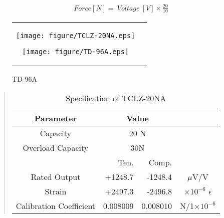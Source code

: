 \documentclass[a4paper,12pt]{article_vdlab_sotsuron}
\begin{document}
\vspace{-10mm}
\begin{eqnarray}
\label{eq:loadcell}
 &  Force [N] = \ Voltage \ [V]\times \frac{20}{10}
\end{eqnarray}
\vspace{-8mm}
\begin{figure}[h]
\begin{tabular}{cc}
\begin{minipage}{0.45\textwidth}
    \centering
    \texttt{[image: figure/TCLZ-20NA.eps]}
     \vspace{2mm}
     \caption{TCLZ-20NA}
     \label{fig:loadcell}
\end{minipage}
\begin{minipage}{0.45\hsize}
\centering
     \texttt{[image: figure/TD-96A.eps]}
     \vspace{2mm}
     \caption{TD-96A}
     \label{fig:TD-96A}
\end{minipage}
\end{tabular}
\end{figure}

\vspace{1mm}
 \begin{quote}{\small
\begin{table}[htbp]
 \begin{center}
 \caption{Specification of TCLZ-20NA}
 \label{tab:loadcell}
 \begin{tabular}{crrc}\hline
    Parameter & \multicolumn{2}{c}{Value}&\\\hline
    Capacity & \multicolumn{2}{c}{20 N}&\\
    Overload Capacity & \multicolumn{2}{c}{30N}&\\
      & Ten.&Comp.\\
    Rated Output & +1248.7 & -1248.4 & $\mu$V/V \\
    Strain & +2497.3 & -2496.8 & $\times 10^{-6}$ $\epsilon$ \\
    Calibration Coefficient & 0.008009 & 0.008010 & N/1$\times 10^{-6}$ \\\hline
  \end{tabular}
 \end{center}
\end{table}
}\end{quote}
\end{document}
